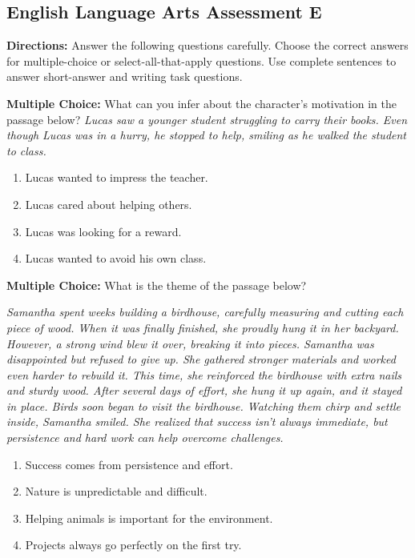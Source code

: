 \documentclass[12pt]{article}
\begin{document}
\subsection*{English Language Arts Assessment E}
\onehalfspacing

\begin{tcolorbox}[colframe=black!50, colback=white, title=Assessment Directions]
\textbf{Directions:} Answer the following questions carefully. Choose the correct answers for multiple-choice or select-all-that-apply questions. Use complete sentences to answer short-answer and writing task questions.
\end{tcolorbox}

\begin{tcolorbox}[colframe=black!50, colback=white, title=Question 1]
\textbf{Multiple Choice:} What can you infer about the character’s motivation in the passage below?  
\textit{Lucas saw a younger student struggling to carry their books. Even though Lucas was in a hurry, he stopped to help, smiling as he walked the student to class.}  
\begin{enumerate}[label=(\Alph*)]
\item Lucas wanted to impress the teacher.  
\item Lucas cared about helping others.  
\item Lucas was looking for a reward.  
\item Lucas wanted to avoid his own class.  
\end{enumerate}
\end{tcolorbox}

\begin{tcolorbox}[colframe=black!50, colback=white, title=Question 2]
\textbf{Multiple Choice:} What is the theme of the passage below?  

\textit{Samantha spent weeks building a birdhouse, carefully measuring and cutting each piece of wood. When it was finally finished, she proudly hung it in her backyard. However, a strong wind blew it over, breaking it into pieces. Samantha was disappointed but refused to give up. She gathered stronger materials and worked even harder to rebuild it. This time, she reinforced the birdhouse with extra nails and sturdy wood. After several days of effort, she hung it up again, and it stayed in place. Birds soon began to visit the birdhouse. Watching them chirp and settle inside, Samantha smiled. She realized that success isn’t always immediate, but persistence and hard work can help overcome challenges.}

\begin{enumerate}[label=(\Alph*)]
\item Success comes from persistence and effort.  
\item Nature is unpredictable and difficult.  
\item Helping animals is important for the environment.  
\item Projects always go perfectly on the first try.  
\end{enumerate}
\end{tcolorbox}
\end{document}
